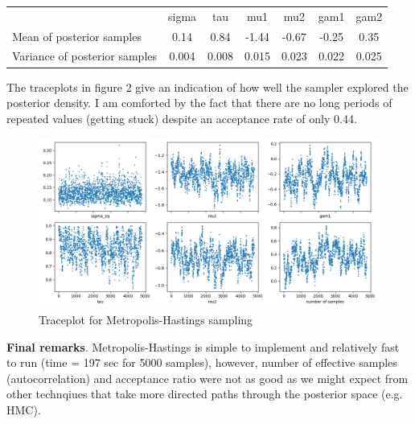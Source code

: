 \documentclass[12pt,letterpaper,twoside]{article}
\begin{document}
\begin{table}[H]
    \begin{tabular}{lcccccc}
    \multicolumn{1}{c}{}          & sigma & tau   & mu1   & mu2   & gam1  & gam2  \\
    Mean of posterior samples     & 0.14  & 0.84  & -1.44 & -0.67 & -0.25 & 0.35  \\
    Variance of posterior samples & 0.004 & 0.008 & 0.015 & 0.023 & 0.022 & 0.025
    \end{tabular}
\end{table}

The traceplots in figure 2 give an indication of how well the sampler 
explored the posterior density. I am comforted by the fact that 
there are no long periods of repeated values (getting stuck) 
despite an acceptance rate of only 0.44.
\begin{figure}[H]
    \centering
    \includegraphics[scale=0.55]{mh_sampled_traceplot.png}
    \caption{Traceplot for Metropolis-Hastings sampling}
\end{figure}

\textbf{Final remarks}. Metropolis-Hastings is simple to implement 
and relatively fast to run (time = 197 sec for 5000 samples), however,
number of effective samples (autocorrelation) and acceptance ratio 
were not as good as we might expect from other technqiues that take 
more directed paths through the posterior space (e.g. HMC).   
\end{document}

